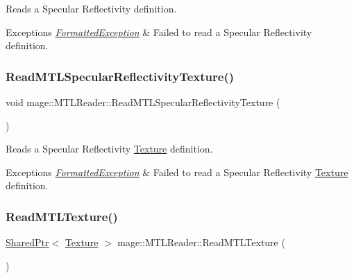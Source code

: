 Reads a Specular Reflectivity definition.


\begin{DoxyExceptions}{Exceptions}
{\em \hyperlink{structmage_1_1_formatted_exception}{Formatted\+Exception}} & Failed to read a Specular Reflectivity definition. \\
\hline
\end{DoxyExceptions}
\hypertarget{classmage_1_1_m_t_l_reader_abb56329a3642b377b006bca6cee60440}{}\label{classmage_1_1_m_t_l_reader_abb56329a3642b377b006bca6cee60440} 
\subsubsection{\texorpdfstring{Read\+M\+T\+L\+Specular\+Reflectivity\+Texture()}{ReadMTLSpecularReflectivityTexture()}}
{\footnotesize\ttfamily void mage\+::\+M\+T\+L\+Reader\+::\+Read\+M\+T\+L\+Specular\+Reflectivity\+Texture (\begin{DoxyParamCaption}{ }\end{DoxyParamCaption})\hspace{0.3cm}{\ttfamily [private]}}

Reads a Specular Reflectivity \hyperlink{classmage_1_1_texture}{Texture} definition.


\begin{DoxyExceptions}{Exceptions}
{\em \hyperlink{structmage_1_1_formatted_exception}{Formatted\+Exception}} & Failed to read a Specular Reflectivity \hyperlink{classmage_1_1_texture}{Texture} definition. \\
\hline
\end{DoxyExceptions}
\hypertarget{classmage_1_1_m_t_l_reader_a7ff401dab1b58709debff6cbe2c02d0c}{}\label{classmage_1_1_m_t_l_reader_a7ff401dab1b58709debff6cbe2c02d0c} 
\subsubsection{\texorpdfstring{Read\+M\+T\+L\+Texture()}{ReadMTLTexture()}}
{\footnotesize\ttfamily \hyperlink{namespacemage_a1e01ae66713838a7a67d30e44c67703e}{Shared\+Ptr}$<$ \hyperlink{classmage_1_1_texture}{Texture} $>$ mage\+::\+M\+T\+L\+Reader\+::\+Read\+M\+T\+L\+Texture (\begin{DoxyParamCaption}{ }\end{DoxyParamCaption})\hspace{0.3cm}{\ttfamily [private]}}


